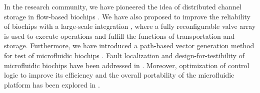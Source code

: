 In the research community, we have pioneered the idea %
of distributed channel storage in flow-based biochips \cite{TsengLSH15}. 
We have also proposed to improve
the reliability of biochips with a large-scale integration \cite{TBMTtcad}, 
where a fully reconfigurable valve array is used to execute operations 
and fulfill the functions of transportation and storage. 
Furthermore,  
we have introduced a path-based vector generation method for test of  
microfluidic biochips \cite{CBBK17}. 
Fault localization and design-for-testibility
of microfluidic biochips have been addressed in \cite{Liu2018dac,aledate19}.
Moreover, optimization of control logic to improve its efficiency and the overall
portability of the microfluidic platform has been explored in \cite{Zhu2018iccad}.


